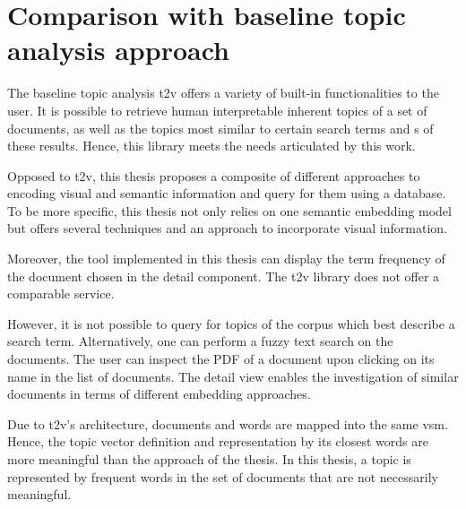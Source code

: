 \newpage
\section{Comparison with baseline topic analysis approach}\label{sec:evaluation-top-model-app}

The baseline topic analysis \ac{t2v} offers a variety of built-in functionalities to the user.
It is possible to retrieve human interpretable inherent topics of a set of documents, 
as well as the topics most similar to certain search terms 
and \wordcloud{}s of these results.
Hence, this library meets the needs articulated by this work.

Opposed to \ac{t2v}, this thesis proposes a composite of different approaches to encoding visual and semantic information 
and query for them using a database.
To be more specific, this thesis not only relies on one semantic embedding model but offers several techniques and an approach to incorporate visual information.

Moreover, the tool implemented in this thesis can display the term frequency of the document chosen in the detail component.
The \ac{t2v} library does not offer a comparable service.

However, it is not possible to query for topics of the corpus which best describe a search term.
Alternatively, one can perform a fuzzy text search on the documents.
The user can inspect the PDF of a document upon clicking on its name in the list of documents.
The detail view enables the investigation of similar documents in terms of different embedding approaches.

Due to \ac{t2v}'s architecture, documents and words are mapped into the same \ac{vsm}.
Hence, the topic vector definition and representation by its closest words are more meaningful than the approach of the thesis. 
In this thesis, a topic is represented by frequent words in the set of documents that are not necessarily meaningful. 
